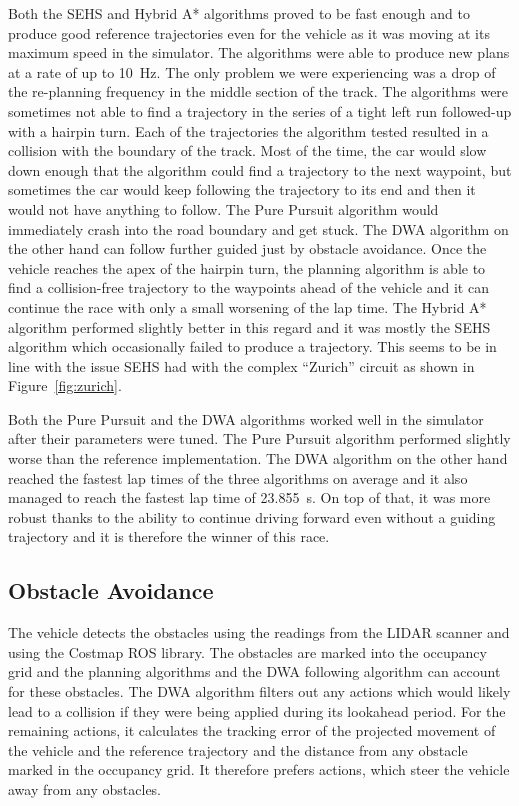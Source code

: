 Both the \gls{SEHS} and Hybrid A* algorithms proved to be fast enough and to produce good reference trajectories even for the vehicle as it was moving at its maximum speed in the simulator. The algorithms were able to produce new plans at a rate of up to \SI{10}{\hertz}. The only problem we were experiencing was a drop of the re-planning frequency in the middle section of the track. The algorithms were sometimes not able to find a trajectory in the series of a tight left run followed-up with a hairpin turn. Each of the trajectories the algorithm tested resulted in a collision with the boundary of the track. Most of the time, the car would slow down enough that the algorithm could find a trajectory to the next waypoint, but sometimes the car would keep following the trajectory to its end and then it would not have anything to follow. The Pure Pursuit algorithm would immediately crash into the road boundary and get stuck. The \gls*{DWA} algorithm on the other hand can follow further guided just by obstacle avoidance. Once the vehicle reaches the apex of the hairpin turn, the planning algorithm is able to find a collision-free trajectory to the waypoints ahead of the vehicle and it can continue the race with only a small worsening of the lap time. The Hybrid A* algorithm performed slightly better in this regard and it was mostly the SEHS algorithm which occasionally failed to produce a trajectory. This seems to be in line with the issue SEHS had with the complex ``Zurich'' circuit as shown in Figure~\ref{fig:zurich}.

Both the Pure Pursuit and the \gls*{DWA} algorithms worked well in the simulator after their parameters were tuned. The Pure Pursuit algorithm performed slightly worse than the reference implementation. The \gls*{DWA} algorithm on the other hand reached the fastest lap times of the three algorithms on average and it also managed to reach the fastest lap time of \SI{23.855}{\second}. On top of that, it was more robust thanks to the ability to continue driving forward even without a guiding trajectory and it is therefore the winner of this race.

\subsection{Obstacle Avoidance}

The vehicle detects the obstacles using the readings from the LIDAR scanner and using the Costmap ROS library. The obstacles are marked into the occupancy grid and the planning algorithms and the DWA following algorithm can account for these obstacles. The DWA algorithm filters out any actions which would likely lead to a collision if they were being applied during its lookahead period. For the remaining actions, it calculates the tracking error of the projected movement of the vehicle and the reference trajectory and the distance from any obstacle marked in the occupancy grid. It therefore prefers actions, which steer the vehicle away from any obstacles.

